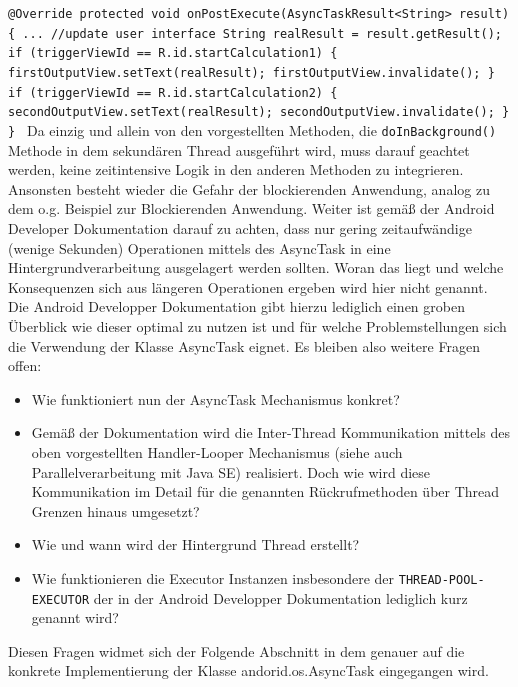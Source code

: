 \documentclass[12pt,oneside,a4paper,bibtotoc,liststotoc]{scrreprt}
\begin{document}
\newline
\texttt{@Override\newline
   protected void onPostExecute(AsyncTaskResult<String> result) \{\newline
...\newline
           //update user interface\newline
           String realResult = result.getResult();\newline
\newline
           if (triggerViewId == R.id.startCalculation1) \{\newline
               firstOutputView.setText(realResult);\newline
               firstOutputView.invalidate();\newline
           \}\newline
           if (triggerViewId == R.id.startCalculation2) \{\newline
               secondOutputView.setText(realResult);\newline
               secondOutputView.invalidate();\newline
           \}\newline
       \}\newline
}
Da einzig und allein von den vorgestellten Methoden, die \texttt{doInBackground()} Methode in dem sekundären Thread ausgeführt wird, muss darauf geachtet werden, keine zeitintensive Logik in den anderen Methoden zu integrieren. Ansonsten besteht wieder die Gefahr der blockierenden Anwendung, analog zu dem o.g. Beispiel zur Blockierenden Anwendung. Weiter ist gemäß der Android Developer Dokumentation darauf zu achten, dass nur gering zeitaufwändige (wenige Sekunden) Operationen mittels des AsyncTask in eine Hintergrundverarbeitung ausgelagert werden sollten. Woran das liegt und welche Konsequenzen sich aus längeren Operationen ergeben wird hier nicht genannt. Die Android Developper Dokumentation gibt hierzu lediglich einen groben Überblick wie dieser optimal zu nutzen ist und für welche Problemstellungen sich die Verwendung der Klasse AsyncTask eignet. Es bleiben also weitere Fragen offen:
\begin{itemize}
\item Wie funktioniert nun der AsyncTask Mechanismus konkret?
\item Gemäß der Dokumentation wird die Inter-Thread Kommunikation mittels des oben vorgestellten Handler-Looper Mechanismus (siehe auch Parallelverarbeitung mit Java SE) realisiert. Doch wie wird diese Kommunikation im Detail für die genannten Rückrufmethoden über Thread Grenzen hinaus umgesetzt?
\item Wie und wann wird der Hintergrund Thread erstellt?
\item Wie funktionieren die Executor Instanzen insbesondere der \texttt{THREAD-POOL-EXECUTOR} der in der Android Developper Dokumentation lediglich kurz genannt wird?
\end{itemize}
Diesen Fragen widmet sich der Folgende Abschnitt in dem genauer auf die konkrete Implementierung der Klasse andorid.os.AsyncTask eingegangen wird.
\end{document}
